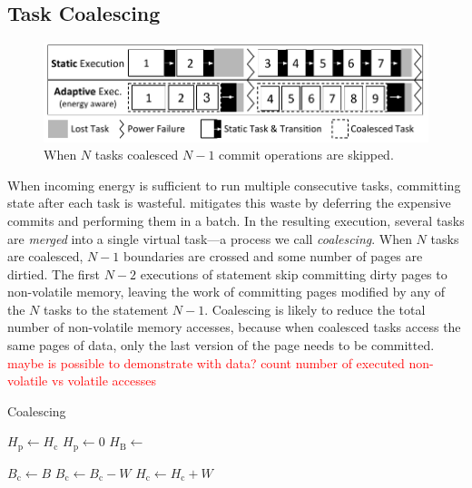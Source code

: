 \subsection{Task Coalescing}
\label{sec:task_coalescing}

\begin{figure}
	\centering
	\includegraphics[width=0.5\columnwidth]{figures/coal_Intro_Figure.pdf}
	\caption{When $N$ tasks coalesced $N-1$ commit operations are skipped.}
	\label{fig:coalIntro}
\end{figure}

When incoming energy is sufficient to run multiple consecutive tasks,
committing state after each task is wasteful. \sys mitigates this
waste by deferring the expensive commits and performing them in a
batch. In the resulting execution, several tasks are \emph{merged} into a
single virtual task---a process we call \emph{coalescing}. 
%
When $N$ tasks are coalesced, $N-1$ boundaries are crossed and some number of
pages are dirtied. The first $N-2$ executions of \transition statement skip
committing dirty pages to non-volatile memory, leaving the work of committing
pages modified by any of the $N$ tasks to the statement $N-1$.
Coalescing is likely to reduce the total number of non-volatile memory
accesses, because when coalesced tasks access the same pages of data, only the
last version of the page needs to be committed.  \textcolor{red}{maybe is possible to demonstrate with data? count number of executed non-volatile vs volatile accesses}

\begin{algorithm}
	\caption{Coalescing}
	\label{algo:genCoalescing}
	\scriptsize
	\begin{algorithmic}[1]
        \State $H_\text{p} \gets H_\text{c}$
        \State $H_\text{p} \gets 0$ 
        \State $H_\text{B} \leftarrow $ 

	        \State $ B_\text{c} \gets B$
		        \State {}
		        \State $B_\text{c} \gets B_\text{c} - W$
				\State $H_\text{c} \gets H_\text{c} + W$
	        \EndWhile
	        \State {}
        \EndWhile
	\end{algorithmic}
\end{algorithm}

